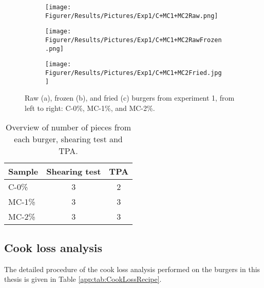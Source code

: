 \begin{figure}[H]
\captionsetup[subfigure]{justification=Centering}
\begin{subfigure}[t]{\textwidth}
    \texttt{[image: Figurer/Results/Pictures/Exp1/C+MC1+MC2Raw.png]}
    \caption{}
\end{subfigure}
\bigskip %
\begin{subfigure}[t]{\textwidth}
    \texttt{[image: Figurer/Results/Pictures/Exp1/C+MC1+MC2RawFrozen.png]}
    \caption{}
\end{subfigure}
\bigskip %
\begin{subfigure}[t]{\textwidth}
    \texttt{[image: Figurer/Results/Pictures/Exp1/C+MC1+MC2Fried.jpg]}
    \caption{}
\end{subfigure}

\caption{Raw (a), frozen (b), and fried (c) burgers from experiment 1, from left to right: C-0\%, MC-1\%, and MC-2\%.} 
\label{fig:Burgers:Exp1}
\end{figure}

\begin{table}[H]
    \caption{Overview of number of pieces from each burger, shearing test and TPA.}
    \centering
    \begin{tabular}{l|cc}
\toprule

\textbf{Sample} & \textbf{Shearing test} & \textbf{TPA}\\

\hline

C-0\%       & 3 & 2 \\
MC-1\%      & 3 & 3 \\
MC-2\%      & 3 & 3 \\ 

\bottomrule
    \end{tabular}
    \label{tab:Results:Pieces:Exp2}
\end{table}

\subsection{Cook loss analysis}
\label{app:sec:CookLoss}

The detailed procedure of the cook loss analysis performed on the burgers in this thesis is given in Table \ref{app:tab:CookLossRecipe}.


